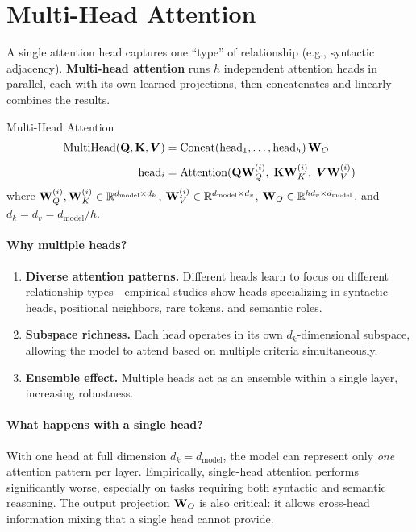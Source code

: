 \section{Multi-Head Attention}
\label{sec:multi-head}

A single attention head captures one ``type'' of relationship (e.g., syntactic
adjacency).  \textbf{Multi-head attention} runs $h$ independent attention heads
in parallel, each with its own learned projections, then concatenates and
linearly combines the results.

\begin{mathresult}{Multi-Head Attention}
\begin{align*}
    \text{MultiHead}(\mathbf{Q}, \mathbf{K}, \bm{V}) &= \text{Concat}(\text{head}_1, \ldots, \text{head}_h)\,\mathbf{W}_O \\[4pt]
    \text{head}_i &= \text{Attention}(\mathbf{Q}\mathbf{W}_Q^{(i)},\; \mathbf{K}\mathbf{W}_K^{(i)},\; \bm{V}\mathbf{W}_V^{(i)})
\end{align*}
where $\mathbf{W}_Q^{(i)}, \mathbf{W}_K^{(i)} \in \mathbb{R}^{d_{\text{model}} \times d_k}$,\;
$\mathbf{W}_V^{(i)} \in \mathbb{R}^{d_{\text{model}} \times d_v}$,\;
$\mathbf{W}_O \in \mathbb{R}^{hd_v \times d_{\text{model}}}$, and
$d_k = d_v = d_{\text{model}} / h$.
\end{mathresult}

\paragraph{Why multiple heads?}
\begin{enumerate}
    \item \textbf{Diverse attention patterns.}  Different heads learn to focus
          on different relationship types---empirical studies show heads
          specializing in syntactic heads, positional neighbors, rare tokens,
          and semantic roles.
    \item \textbf{Subspace richness.}  Each head operates in its own
          $d_k$-dimensional subspace, allowing the model to attend based on
          multiple criteria simultaneously.
    \item \textbf{Ensemble effect.}  Multiple heads act as an ensemble within
          a single layer, increasing robustness.
\end{enumerate}

\paragraph{What happens with a single head?}
With one head at full dimension $d_k = d_{\text{model}}$, the model can
represent only \emph{one} attention pattern per layer.  Empirically,
single-head attention performs significantly worse, especially on tasks
requiring both syntactic and semantic reasoning.  The output projection
$\mathbf{W}_O$ is also critical: it allows cross-head information mixing that a
single head cannot provide.

